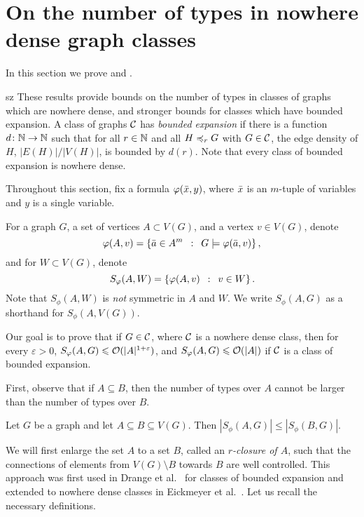 \section{On the number of types in nowhere dense graph classes}

In this section we prove  and .
\begin{change}{sz}
	These results provide bounds on the number of types in classes of graphs which are nowhere dense, 
	and stronger bounds for classes which have bounded expansion. 
A class of graphs $\mathcal{C}$ has \emph{bounded expansion}
	if there is a function $d\colon\mathbb{N}\rightarrow\mathbb{N}$ such that for all 
	$r\in \mathbb{N}$ and all $H\preccurlyeq_rG$ with $G\in\mathcal{C}$, the edge density
	of $H$, $|E(H)|/|V(H)|$, is bounded by $d(r)$. Note that every 
	class of bounded expansion is nowhere dense.
	
Throughout this section, fix a formula  $\varphi(\bar{x},y)$, where
$\bar{x}$ is an $m$-tuple of variables and $y$ is a single variable.

For a graph $G$, a set of  vertices $A\subset V(G)$, and a vertex $v\in V(G)$,
denote
\[\varphi(A,v)=\left\{\bar{a} \in A^m  \,~:~\,  G\models\varphi(\bar{a},v) \right\},\]
and for $W\subset V(G)$, denote
\[S_\varphi(A,W)=\left\{\varphi(A,v) \,~:~\,  v\in W \right\}.\]
Note that $S_\phi(A,W)$ is \emph{not} symmetric in $A$ and $W$.
We write $S_\phi(A,G)$ as a shorthand for $S_\phi(A,V(G))$.

Our goal is to prove that if $G\in \mathcal{C}$, where $\mathcal{C}$ is a nowhere dense class,
then for every $\varepsilon>0$,   $S_\varphi(A,G)\leqslant \mathcal{O}(|A|^{1+\varepsilon})$, and 
$S_\varphi(A,G)\leqslant \mathcal{O}(|A|)$ if $\mathcal{C}$ is a class of bounded expansion.
\end{change}

First, observe that if $A\subseteq B$, then the number of types
over $A$ cannot be larger than the number of types over $B$. 

\begin{lemma}\label{lem:types-over-B}
Let $G$ be a graph and let $A\subseteq B\subseteq V(G)$. Then 
$|S_\phi(A,G)|\leq |S_\phi(B,G)|$. 
\end{lemma}

We will first enlarge the set $A$ to a set $B$, called
an \emph{$r$-closure of $A$}, such 
that the connections of elements from $V(G)\setminus B$ 
towards $B$ are well controlled. This approach
was first used in Drange et al.~\cite{drange2016kernelization} for
classes of bounded expansion and extended to nowhere dense
classes in Eickmeyer et al.~\cite{eickmeyer2016neighborhood}. 
Let us recall the necessary definitions.

